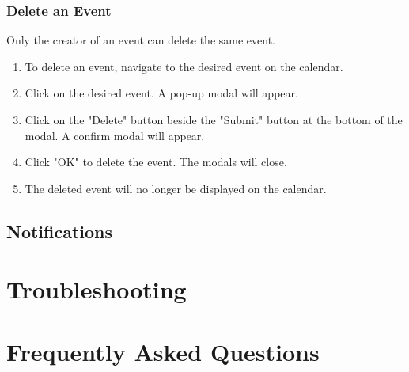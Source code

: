 \documentclass[12pt]{article}
\begin{document}
\subsubsection{Delete an Event}
Only the creator of an event can delete the same event. 
\begin{enumerate}
\item To delete an event, navigate to the desired event on the calendar. 
\item Click on the desired event. A pop-up modal will appear. 
\item Click on the "Delete" button beside the "Submit" button at the bottom of the modal.  A confirm modal will appear.
\item Click "OK" to delete the event. The modals will close.
\item The deleted event will no longer be displayed on the calendar.
\end{enumerate}

\subsection{Notifications}



\section{Troubleshooting}

\section{Frequently Asked Questions}

\end{document}
